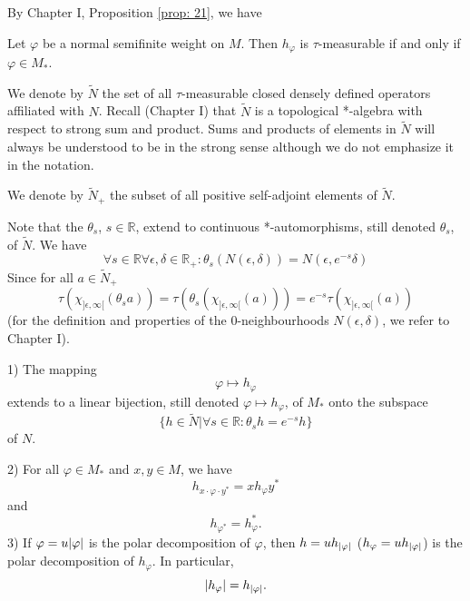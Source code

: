 By Chapter I, Proposition \ref{prop: 21}, we have 
\begin{corollary}\label{Chap2: Coro: 6}
    Let $\varphi$ be a normal semifinite weight on $M$. Then $h_\varphi$ is $\tau$-measurable if and only if $\varphi\in M_*$. 
\end{corollary}
We denote by $\tilde{N}$ the set of all $\tau$-measurable closed densely defined operators affiliated with $N$. Recall (Chapter I) that $\tilde{N}$ is a topological *-algebra with respect to strong sum and product. Sums and products of elements in $\tilde{N}$ will always be understood to be 
in the strong sense although we do not emphasize it in the notation.\par 
We denote by $\tilde{N}_+$ the subset of all positive self-adjoint elements of $\tilde{N}$.\par
Note that the $\theta_s$, $s\in \mathbb{R}$, extend to continuous *-automorphisms, still denoted $\theta_s$, of $\tilde{N}$. We have 
\begin{equation}
    \forall s\in \mathbb{R} \forall \epsilon,\delta\in \mathbb{R}_+: \theta_s(N(\epsilon,\delta))=N(\epsilon,e^{-s}\delta)
\end{equation}
Since for all $a\in \tilde{N}_+$
\[
    \tau(\chi_{]\epsilon,\infty[}(\theta_sa))=\tau(\theta_s(\chi_{]\epsilon,\infty[}(a)))=e^{-s}\tau(\chi_{]\epsilon,\infty[}(a))  
\]
(for the definition and properties of the $0$-neighbourhoods $N(\epsilon,\delta)$, we refer to Chapter I).
\begin{theorem}\label{Chap2: Thm: 7}
    1) The mapping 
\[
  \varphi\mapsto h_\varphi  
\]
extends to a linear bijection, still denoted $\varphi\mapsto h_\varphi$, of $M_*$ onto the subspace
\begin{equation}\label{Chap2: eqn: 19}
    \{h\in \tilde{N}|\forall s\in \mathbb{R}:\theta_sh=e^{-s}h\}  
\end{equation}
of $N$.\par 
2) For all $\varphi\in M_*$ and $x,y \in M$, we have 
\begin{equation}\label{Chap2: eqn: 20}
    h_{x\cdot \varphi \cdot y^*}=x h_\varphi y^*  
\end{equation}
and
\begin{equation}\label{Chap2: eqn: 21}
     h_{\varphi^*}=h_\varphi^*.  
\end{equation}
3) If $\varphi=u\abs{\varphi}$ is the polar decomposition of $\varphi$, then $h=uh_{\abs{\varphi}}$ {\color{red} ($h_\varphi=uh_{\abs{\varphi}}$)} is the polar decomposition of $h_\varphi$. In particular, 
\begin{equation}
    \abs{h_\varphi}=h_{\abs{\varphi}}.
\end{equation}
\end{theorem}
